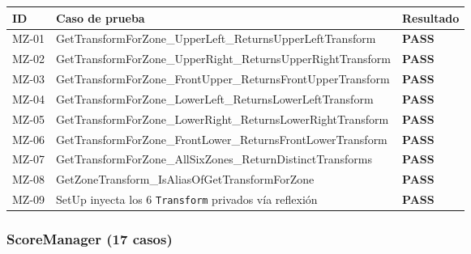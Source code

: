 \documentclass[12pt, a4paper]{article}
\newcommand{\pass}{\textcolor{heroGreen}{\textbf{PASS}}}
\begin{document}
\renewcommand{\arraystretch}{1.2}
\begin{longtable}{>{\ttfamily\small}p{1cm} p{8.5cm} >{\centering\arraybackslash}p{2cm}}
  \toprule
  \textbf{ID} & \textbf{Caso de prueba} & \textbf{Resultado} \\
  \midrule
  \endhead
  MZ-01 & GetTransformForZone\_UpperLeft\_ReturnsUpperLeftTransform & \pass \\
  MZ-02 & GetTransformForZone\_UpperRight\_ReturnsUpperRightTransform & \pass \\
  MZ-03 & GetTransformForZone\_FrontUpper\_ReturnsFrontUpperTransform & \pass \\
  MZ-04 & GetTransformForZone\_LowerLeft\_ReturnsLowerLeftTransform & \pass \\
  MZ-05 & GetTransformForZone\_LowerRight\_ReturnsLowerRightTransform & \pass \\
  MZ-06 & GetTransformForZone\_FrontLower\_ReturnsFrontLowerTransform & \pass \\
  MZ-07 & GetTransformForZone\_AllSixZones\_ReturnDistinctTransforms & \pass \\
  MZ-08 & GetZoneTransform\_IsAliasOfGetTransformForZone & \pass \\
  MZ-09 & SetUp inyecta los 6 \texttt{Transform} privados vía reflexión & \pass \\
  \bottomrule
\end{longtable}

\subsubsection{ScoreManager (17 casos)}
\end{document}
